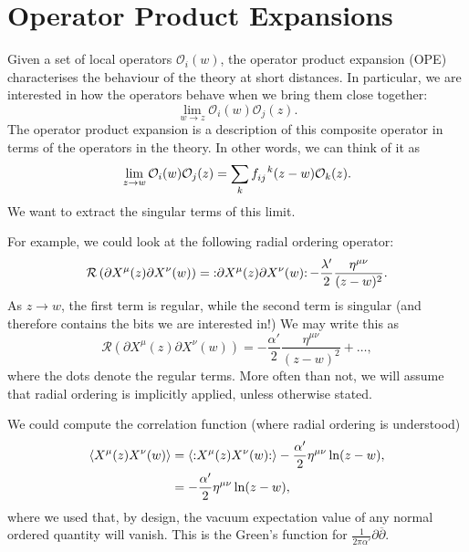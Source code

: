 \section{Operator Product Expansions}%
\label{sec:operator_product_expansions}

Given a set of local operators $\mathcal{O}_i(w)$, the operator product expansion (OPE) characterises the behaviour of the theory at short distances.  In particular, we are interested in how the operators behave when we bring them close together:
\begin{equation}
  \lim_{w \to z} \mathcal{O}_i(w) \mathcal{O}_j(z).
\end{equation}
The operator product expansion is a description of this composite operator in terms of the operators in the theory. In other words, we can think of it as
\begin{equation}
  \lim_{z \to w} \mathcal{O}_i(w) \mathcal{O}_j(z) = \sum_{k} f\indices{_{ij}^{k}} (z-w) \mathcal{O}_k(z).
\end{equation}
We want to extract the singular terms of this limit.

For example, we could look at the following radial ordering operator:
\begin{equation}
  \mathcal{R} \left( \partial X^{\mu}(z) \partial X^{\nu} (w) \right) = \mathop{:}\nolimits\!\partial X^{\mu}(z) \partial X^{\nu}(w)\!\mathop{:}\nolimits - \frac{\lambda'}{2} \frac{\eta^{\mu\nu}}{(z - w)^2}.
\end{equation}
As $z \to w$, the first term is regular, while the second term is singular (and therefore contains the bits we are interested in!)
We may write this as
\begin{equation}
  \label{eq:14-parxope}
  \mathcal{R} \left( \partial X^{\mu}(z) \partial X^{\nu} (w) \right)  = -\frac{\alpha'}{2} \frac{\eta^{\mu\nu}}{(z - w)^2} + \dots,
\end{equation}
where the dots denote the regular terms.
More often than not, we will assume that radial ordering is implicitly applied, unless otherwise stated.

We could compute the correlation function (where radial ordering is understood)
\begin{align}
  \langle X^{\mu}(z) X^{\nu}(w) \rangle &= \langle \mathop{:}\nolimits\!X^{\mu}(z) X^{\nu}(w)\!\mathop{:}\nolimits \rangle - \frac{\alpha'}{2} \eta^{\mu\nu} \ln(z - w), \\
					&= -\frac{\alpha'}{2} \eta^{\mu\nu} \ln(z - w),
\end{align}
where we used that, by design, the vacuum expectation value of any normal ordered quantity will vanish.
This is the Green's function for $\frac{1}{2\pi \alpha'} \partial \overline{\partial}{}$.

